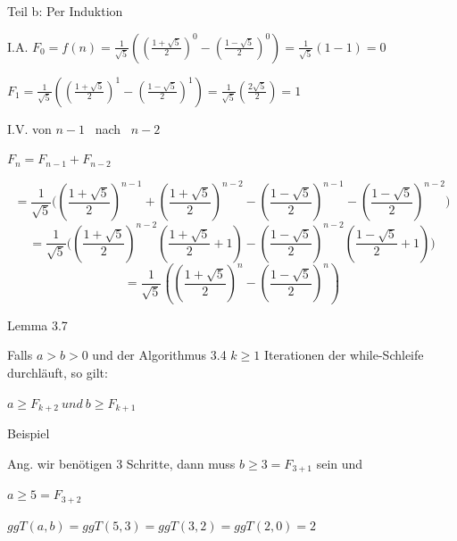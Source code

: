\documentclass[10pt]{beamer}
\begin{document}
\begin{frame}{Teil b: Per Induktion}

I.A. $ F_0= f(n)= 
  \frac{1}{\sqrt{5}}((\frac{1 + \sqrt{5}}{2})^0 - ( \frac{1 - \sqrt{5}}{2})^0) = \frac{1}{\sqrt{5}} (1-1)= 0 $

\vspace{0.15cm}
    $F_1=  \frac{1}{\sqrt{5}} ((\frac{1 + \sqrt{5}}{2})^1 - ( \frac{1 - \sqrt{5}}{2})^1)= \frac{1}{\sqrt{5}} (\frac{2\sqrt{5}}{2}) = 1 $

\vspace{0.4cm}

\noindent I.V. von $n-1$ \ nach \ $ n-2$

$F_n= F_{n-1} + F_{n-2}$

\[
= \frac{1}{\sqrt{5}} \Bigg(
\left(\frac{1+\sqrt{5}}{2}\right)^{n-1}
+
\left(\frac{1+\sqrt{5}}{2}\right)^{n-2}
-
\left(\frac{1-\sqrt{5}}{2}\right)^{n-1}
-
\left(\frac{1-\sqrt{5}}{2}\right)^{n-2}
\Bigg)
\]
\[
= \frac{1}{\sqrt{5}} \Bigg(
\left(\frac{1+\sqrt{5}}{2}\right)^{n-2}
\left(\frac{1+\sqrt{5}}{2} + 1 \right)
-
\left(\frac{1-\sqrt{5}}{2}\right)^{n-2}
\left(\frac{1-\sqrt{5}}{2} + 1 \right)
\Bigg)
\]
\[
= \frac{1}{\sqrt{5}} \left(
\left(\frac{1+\sqrt{5}}{2}\right)^n
-
\left(\frac{1-\sqrt{5}}{2}\right)^n
\right)
\]
    
\end{frame}

\begin{frame}{Lemma 3.7}

Falls $a > b > 0$ und der Algorithmus 3.4 $k \geq 1$ Iterationen der while-Schleife durchläuft, so gilt: 


\vspace{0.25cm}
$a \geq F_{k+2} \ und \ b \geq F_{k+1}$

    
\end{frame}


\begin{frame}{Beispiel}

Ang. wir benötigen 3 Schritte, dann muss $b \geq 3= F_{3+1}$  sein und 

\noindent $a \geq 5= F_{3+2}$

\vspace{0.3cm}
$ggT(a,b)= ggT(5,3)= ggT(3,2)= ggT(2,0)= 2$ 
    
\end{frame}
\end{document}
